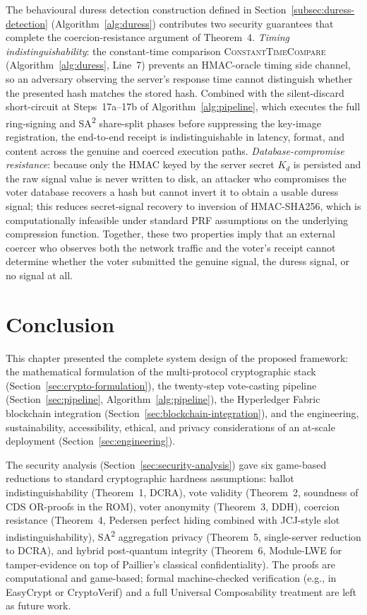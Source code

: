 The behavioural duress detection construction defined in Section~\ref{subsec:duress-detection} (Algorithm~\ref{alg:duress}) contributes two security guarantees that complete the coercion-resistance argument of Theorem~4. \emph{Timing indistinguishability}: the constant-time comparison \textsc{ConstantTimeCompare} (Algorithm~\ref{alg:duress}, Line~7) prevents an HMAC-oracle timing side channel, so an adversary observing the server's response time cannot distinguish whether the presented hash matches the stored hash. Combined with the silent-discard short-circuit at Steps~17a--17b of Algorithm~\ref{alg:pipeline}, which executes the full ring-signing and SA\textsuperscript{2} share-split phases before suppressing the key-image registration, the end-to-end receipt is indistinguishable in latency, format, and content across the genuine and coerced execution paths. \emph{Database-compromise resistance}: because only the HMAC keyed by the server secret $K_d$ is persisted and the raw signal value is never written to disk, an attacker who compromises the voter database recovers a hash but cannot invert it to obtain a usable duress signal; this reduces secret-signal recovery to inversion of HMAC-SHA256, which is computationally infeasible under standard PRF assumptions on the underlying compression function. Together, these two properties imply that an external coercer who observes both the network traffic and the voter's receipt cannot determine whether the voter submitted the genuine signal, the duress signal, or no signal at all.

\section{Conclusion}
\label{sec:meth-conclusion}

This chapter presented the complete system design of the proposed framework: the mathematical formulation of the multi-protocol cryptographic stack (Section~\ref{sec:crypto-formulation}), the twenty-step vote-casting pipeline (Section~\ref{sec:pipeline}, Algorithm~\ref{alg:pipeline}), the Hyperledger Fabric blockchain integration (Section~\ref{sec:blockchain-integration}), and the engineering, sustainability, accessibility, ethical, and privacy considerations of an at-scale deployment (Section~\ref{sec:engineering}).

The security analysis (Section~\ref{sec:security-analysis}) gave six game-based reductions to standard cryptographic hardness assumptions: ballot indistinguishability (Theorem~1, DCRA), vote validity (Theorem~2, soundness of CDS OR-proofs in the ROM), voter anonymity (Theorem~3, DDH), coercion resistance (Theorem~4, Pedersen perfect hiding combined with JCJ-style slot indistinguishability), SA\textsuperscript{2} aggregation privacy (Theorem~5, single-server reduction to DCRA), and hybrid post-quantum integrity (Theorem~6, Module-LWE for tamper-evidence on top of Paillier's classical confidentiality). The proofs are computational and game-based; formal machine-checked verification (e.g., in EasyCrypt or CryptoVerif) and a full Universal Composability treatment are left as future work.

